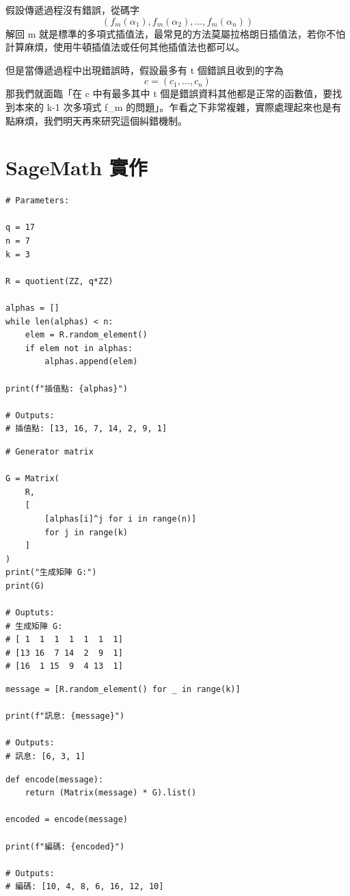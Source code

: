 \documentclass[
]{article}
\begin{document}
假設傳遞過程沒有錯誤，從碼字 \[
(f_{m}(\alpha_{1}),f_{m}(\alpha_{2}),\dots,f_{m}(\alpha_{n}))
\] 解回 m
就是標準的多項式插值法，最常見的方法莫屬拉格朗日插值法，若你不怕計算麻煩，使用牛頓插值法或任何其他插值法也都可以。

但是當傳遞過程中出現錯誤時，假設最多有 t 個錯誤且收到的字為 \[
c = (c_{1},\dots,c_{n})
\] 那我們就面臨「在 c 中有最多其中 t
個是錯誤資料其他都是正常的函數值，要找到本來的 k-1 次多項式 f\_m
的問題」。乍看之下非常複雜，實際處理起來也是有點麻煩，我們明天再來研究這個糾錯機制。

\hypertarget{sagemath-ux5be6ux4f5c}{%
\section{SageMath 實作}\label{sagemath-ux5be6ux4f5c}}

\begin{verbatim}
# Parameters:

q = 17
n = 7
k = 3

R = quotient(ZZ, q*ZZ)

alphas = []
while len(alphas) < n:
    elem = R.random_element()
    if elem not in alphas:
        alphas.append(elem)

print(f"插值點: {alphas}")

# Outputs:
# 插值點: [13, 16, 7, 14, 2, 9, 1]
\end{verbatim}

\begin{verbatim}
# Generator matrix

G = Matrix(
    R,
    [
        [alphas[i]^j for i in range(n)]
        for j in range(k)
    ]
)
print("生成矩陣 G:")
print(G)

# Ouptuts:
# 生成矩陣 G:
# [ 1  1  1  1  1  1  1]
# [13 16  7 14  2  9  1]
# [16  1 15  9  4 13  1]
\end{verbatim}

\begin{verbatim}
message = [R.random_element() for _ in range(k)]

print(f"訊息: {message}")

# Outputs:
# 訊息: [6, 3, 1]
\end{verbatim}

\begin{verbatim}
def encode(message):
    return (Matrix(message) * G).list()

encoded = encode(message)

print(f"編碼: {encoded}")

# Outputs:
# 編碼: [10, 4, 8, 6, 16, 12, 10]
\end{verbatim}
\end{document}

